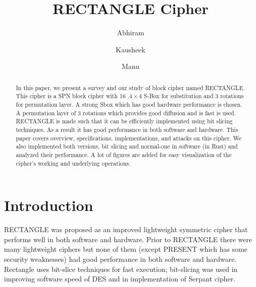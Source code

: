 \documentclass[final]{transcrypto}
\begin{document}
\title[RECTANGLE Cipher]{RECTANGLE Cipher}

\author{Abhiram \and Kausheek \and Manu}
\setDOI{}

\begin{abstract}
In this paper, we present a survey and our study of block cipher named RECTANGLE. This cipher is a SPN block cipher with 16 ,$4\times 4$ S-Box for substitution and 3 rotations for permutation layer. A strong Sbox which has good hardware performance is chosen. A permutation layer of 3 rotations which provides good diffusion and is fast is used. RECTANGLE is made such that it can be efficiently implemented using bit slicing techniques. As a result it has good performance in both software and hardware. This paper covers overview, specifications, implementations, and attacks on this cipher. We also implemented both versions, bit slicing and normal-one in software (in Rust) and analyzed their performance. A lot of figures are added for easy visualization of the cipher's working and underlying operations.
\end{abstract}
\maketitle
\section{Introduction}
RECTANGLE was proposed as an improved lightweight symmetric cipher that performs well in both software and hardware.\cite{rectangle} Prior to RECTANGLE there were many lightweight ciphers but none of them (except PRESENT which has some security weaknesses)\cite{present} had good performance in both software and hardware. Rectangle uses bit-slice techniques for fast execution; bit-slicing was used in improving software speed of DES and in implementation of Serpant cipher\cite{bit1}\cite{bit2}.
\end{document}
